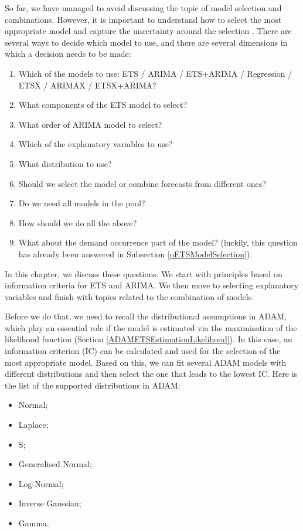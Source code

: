\documentclass[
]{book}
\providecommand{\tightlist}{%
  \setlength{\itemsep}{0pt}\setlength{\parskip}{0pt}}
\theoremstyle{definition}
\theoremstyle{definition}
\theoremstyle{definition}
\theoremstyle{definition}
\theoremstyle{remark}
\begin{document}
So far, we have managed to avoid discussing the topic of model selection and combinations. However, it is important to understand how to select the most appropriate model and capture the uncertainty around the selection \citep[see discussion of sources of uncertainty in Section 1.3 of][]{SvetunkovSBA}. There are several ways to decide which model to use, and there are several dimensions in which a decision needs to be made:

\begin{enumerate}
\def\labelenumi{\arabic{enumi}.}
\tightlist
\item
  Which of the models to use: ETS / ARIMA / ETS+ARIMA / Regression / ETSX / ARIMAX / ETSX+ARIMA?
\item
  What components of the ETS model to select?
\item
  What order of ARIMA model to select?
\item
  Which of the explanatory variables to use?
\item
  What distribution to use?
\item
  Should we select the model or combine forecasts from different ones?
\item
  Do we need all models in the pool?
\item
  How should we do all the above?
\item
  What about the demand occurrence part of the model? (luckily, this question has already been answered in Subsection \ref{oETSModelSelection}).
\end{enumerate}

In this chapter, we discuss these questions. We start with principles based on information criteria \citep[addressed in Chapter 13 of][]{SvetunkovSBA} for ETS and ARIMA. We then move to selecting explanatory variables and finish with topics related to the combination of models.

Before we do that, we need to recall the distributional assumptions in ADAM, which play an essential role if the model is estimated via the maximisation of the likelihood function (Section \ref{ADAMETSEstimationLikelihood}). In this case, an information criterion (IC) can be calculated and used for the selection of the most appropriate model. Based on this, we can fit several ADAM models with different distributions and then select the one that leads to the lowest IC. Here is the list of the supported distributions in ADAM:

\begin{itemize}
\tightlist
\item
  Normal;
\item
  Laplace;
\item
  S;
\item
  Generalised Normal;
\item
  Log-Normal;
\item
  Inverse Gaussian;
\item
  Gamma.
\end{itemize}
\end{document}

